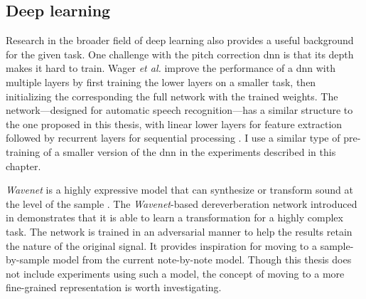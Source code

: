 \subsection{Deep learning}
Research in the broader field of deep learning also provides a useful background for the given task. One challenge with the pitch correction \gls{dnn} is that its depth makes it hard to train. Wager \textit{et al.} improve the performance of a \gls{dnn} with multiple layers by first training the lower layers on a smaller task, then initializing the corresponding the full network with the trained weights. The network---designed for automatic speech recognition---has a similar structure to the one proposed in this thesis, with linear lower layers for feature extraction followed by recurrent layers for sequential processing \cite{wager2020fully}. I use a similar type of pre-training of a smaller version of the \gls{dnn} in the experiments described in this chapter. 

\textit{Wavenet} is a highly expressive model that can synthesize or transform sound at the level of the sample \cite{oord2016wavenet}. The \textit{Wavenet}-based dereverberation network introduced in \cite{su2020hifi} demonstrates that it is able to learn a transformation for a highly complex task. The network is trained in an adversarial manner \cite{goodfellow2014generative} to help the results retain the nature of the original signal. It provides inspiration for moving to a sample-by-sample model from the current note-by-note model. Though this thesis does not include experiments using such a model, the concept of moving to a more fine-grained representation is worth investigating.

